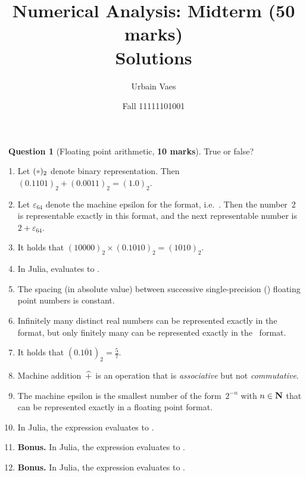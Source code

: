 \documentclass[10pt]{article}
\theoremstyle{definition}
\newtheorem{question}{{\normalfont \faGears}~Question}
\theoremstyle{remark}
\renewcommand{\mymarks}[1]{\textbf{#1 marks}}
\begin{document}
\title{Numerical Analysis: Midterm {\small (\mymarks{50})} \\ Solutions}
\author{Urbain Vaes}
\date{Fall 11111101001}
\maketitle

\begin{question}
    [Floating point arithmetic, \mymarks{10}]
    True or false?
    \begin{enumerate}
        \item Let $(\placeholder)_2$ denote binary representation.
            Then
            \(
                (0.1101)_2 + (0.0011)_2 = (1.0)_2.
            \)

        \item
            Let $\varepsilon_{64}$ denote the machine epsilon for the  format,
            i.e.\ .
            Then the number~2 is representable exactly in this format,
            and the next representable number is $2 + \varepsilon_{64}$.

        \item It holds that
            \(
                (10000)_2 \times (0.1010)_2 = (1010)_2.
            \)
        \item
            In Julia,  evaluates to .

        \item
            The spacing (in absolute value) between successive single-precision () floating point numbers is constant.

        \item
            Infinitely many distinct real numbers can be represented exactly in the~ format,
            but only finitely many can be represented exactly in the~ format.

        \item
            It holds that $(0.\overline{101})_2 = \frac{5}{7}$.

        \item
            Machine addition~$\mathbin{\widehat +}$ is an operation that is \emph{associative} but not \emph{commutative}.

        \item
            The machine epsilon is the smallest number of the form~$2^{-n}$ with $n \in \mathbf N$ that can be represented exactly in a floating point format.

        \item
            In Julia, the expression  evaluates to .

        \item
            \textbf{Bonus.}
            In Julia, the expression  evaluates to .

        \item
            \textbf{Bonus.}
            In Julia, the expression  evaluates to .
    \end{enumerate}
\end{question}
\end{document}
